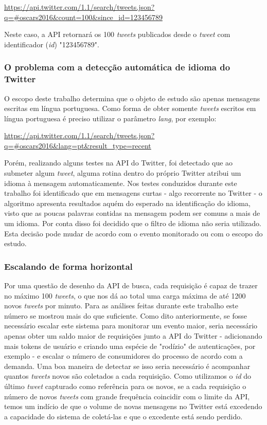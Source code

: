 \url{https://api.twitter.com/1.1/search/tweets.json?q=#oscars2016&count=100&since_id=123456789}

Neste caso, a API retornará os 100 \textit{tweets} publicados desde o \textit{tweet} com identificador (\textit{id}) "123456789".

\subsubsection{O problema com a detecção automática de idioma do Twitter}

O escopo deste trabalho determina que o objeto de estudo são apenas mensagens escritas em língua portuguesa. Como forma de obter somente \textit{tweets} escritos em língua portuguesa é preciso utilizar o parâmetro \textit{lang}, por exemplo:

\url{https://api.twitter.com/1.1/search/tweets.json?q=#oscars2016&lang=pt&result_type=recent}

Porém, realizando alguns testes na API do Twitter, foi detectado que ao submeter algum \textit{tweet}, alguma rotina dentro do próprio Twitter atribui um idioma à mensagem automaticamente. Nos testes conduzidos durante este trabalho foi identificado que em mensagens curtas - algo recorrente no Twitter - o algoritmo apresenta resultados aquém do esperado na identificação do idioma, visto que as poucas palavras contidas na mensagem podem ser comuns a mais de um idioma. Por conta disso foi decidido que o filtro de idioma não seria utilizado. Esta decisão pode mudar de acordo com o evento monitorado ou com o escopo do estudo.

\subsubsection{Escalando de forma horizontal}

Por uma questão de desenho da API de busca, cada requisição é capaz de trazer no máximo 100 \textit{tweets}, o que nos dá ao total uma carga máxima de até 1200 novos \textit{tweets} por minuto. Para as análises feitas durante este trabalho este número se mostrou mais do que suficiente. Como dito anteriormente, se fosse necessário escalar este sistema para monitorar um evento maior, seria necessário apenas obter um saldo maior de requisições junto a API do Twitter - adicionando mais tokens de usuário e criando uma espécie de "rodízio" de autenticações, por exemplo - e escalar o número de consumidores do processo de acordo com a demanda. Uma boa maneira de detectar se isso seria necessário é acompanhar quantos \textit{tweets} novos são coletados a cada requisição. Como utilizamos o \textit{id} do último \textit{tweet} capturado como referência para os novos, se a cada requisição o número de novos \textit{tweets} com grande frequência coincidir com o limite da API, temos um indício de que o volume de novas mensagens no Twitter está excedendo a capacidade do sistema de coletá-las e que o excedente está sendo perdido.

